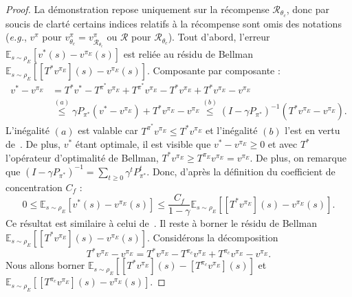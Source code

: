 \documentclass[french,utf8]{./hermes-journal}
\newcommand{\R}{\mathcal{R}}
\newcommand{\E}{\mathbb{E}}
\begin{document}
\begin{proof}
  La démonstration repose uniquement sur la récompense $\R_{\theta_c}$, donc par soucis de clarté certains indices relatifs à la récompense sont omis des notations  
  (\textit{e.g.}, $v^\pi$ pour
  $v^\pi_{\theta_c}=v^\pi_{\R_{\theta_c}}$ ou $\R$ pour $\R_{\theta_c}$). Tout d'abord, l'erreur $\E_{s\sim\rho_E}[v^*(s)-v^{\pi_E}(s)]$ est reliée au résidu de Bellman $\E_{s\sim\rho_E}[[T^*v^{\pi_E}](s)-v^{\pi_E}(s)]$.
  Composante par composante :
  \begin{align}
    v^* - v^{\pi_E} &= T^* v^*  - T^{\pi^*}v^{\pi_E} +
    T^{\pi^*}v^{\pi_E} - T^* v^{\pi_E} + T^* v^{\pi_E} - v^{\pi_E}
    \\
    &\stackrel{(a)}{\leq} \gamma P_{\pi^*}(v^*-v^{\pi_E}) + T^*
    v^{\pi_E} - v^{\pi_E}
    \stackrel{(b)}{\leq} (I-\gamma
    P_{\pi^*})^{-1} (T^* v^{\pi_E} - v^{\pi_E}).
  \end{align}
  L'inégalité $(a)$ est valable car $T^{\pi^*} v^{\pi_E}\leq T^*
  v^{\pi_E}$ et l'inégalité $(b)$ l'est en vertu de~\cite[Lemme~4.2]{Muno007}. De plus, $v^*$ étant optimale, il est visible que  $v^*-v^{\pi_E}\geq 0$ et avec $T^*$ l'opérateur d'optimalité de Bellman, $T^* v^{\pi_E}\geq
  T^{\pi_E}v^{\pi_E}=v^{\pi_E}$. De plus, on remarque que 
  $(I-\gamma P_{\pi^*})^{-1} = \sum_{t\geq 0}\gamma^t P_{\pi^*}^t$.
  Donc, d'après la définition du coefficient de concentration 
  $C_f$ :
  \begin{equation}
    0\leq\E_{s\sim\rho_E}[v^*(s)-v^{\pi_E}(s)] \leq \frac{C_f}{1-\gamma}
    \E_{s\sim\rho_E}\left[[T^*v^{\pi_E}](s) - v^{\pi_E}(s)\right].
    \label{erooesidual}
  \end{equation}
  Ce résultat est similaire à celui de~\cite[Theoreme~4.2]{Muno007}. Il reste à borner le résidu de Bellman $\E_{s\sim\rho_E}[[T^*v^{\pi_E}](s) -
  v^{\pi_E}(s)]$. Considérons la décomposition
  \begin{equation}
    T^* v^{\pi_E} - v^{\pi_E} = T^* v^{\pi_E} - T^{\pi_c}v^{\pi_E}
    + T^{\pi_c}v^{\pi_E}- v^{\pi_E}.
    \label{erooecomposition}
  \end{equation}
  Nous allons borner  $\E_{s\sim\rho_E}[[T^* v^{\pi_E}](s) - [T^{\pi_c}v^{\pi_E}](s)]$
  et $\E_{s\sim\rho_E}[[T^{\pi_c}v^{\pi_E}](s) - v^{\pi_E}(s)]$.


\end{proof}
\end{document}
